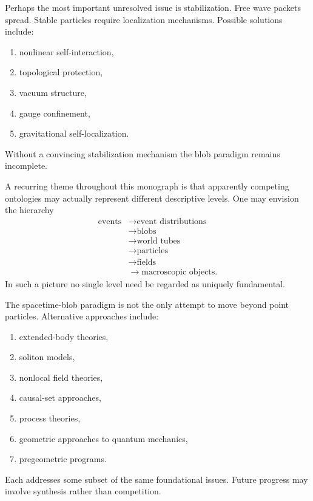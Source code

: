 Perhaps the most important unresolved issue is stabilization.
Free wave packets spread.
Stable particles require localization mechanisms.
Possible solutions include:
\begin{enumerate}
\item nonlinear self-interaction,
\item topological protection,
\item vacuum structure,
\item gauge confinement,
\item gravitational self-localization.
\end{enumerate}
Without a convincing stabilization mechanism the blob paradigm remains
incomplete.

A recurring theme throughout this monograph is that apparently competing
ontologies may actually represent different descriptive levels.
One may envision the hierarchy
\begin{align}
\text{events}&\rightarrow\text{event distributions}\\
&\rightarrow\text{blobs}\\
&\rightarrow\text{world tubes}\\
&\rightarrow\text{particles}\\
&\rightarrow\text{fields}\\
&\rightarrow\text{macroscopic objects}.
\end{align}
In such a picture no single level need be regarded as uniquely
fundamental.

The spacetime-blob paradigm is not the only attempt to move beyond point
particles.
Alternative approaches include:
\begin{enumerate}
\item extended-body theories,
\item soliton models,
\item nonlocal field theories,
\item causal-set approaches,
\item process theories,
\item geometric approaches to quantum mechanics,
\item pregeometric programs.
\end{enumerate}
Each addresses some subset of the same foundational issues.
Future progress may involve synthesis rather than competition.

